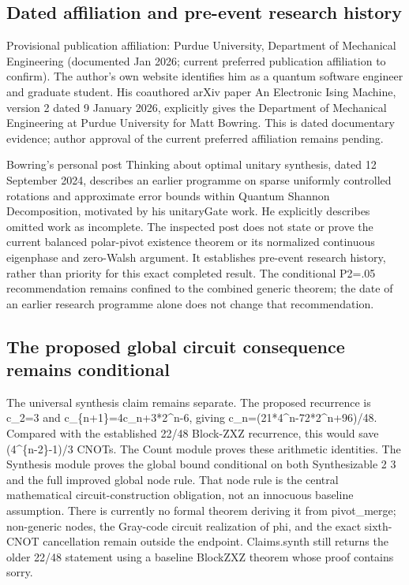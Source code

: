 \documentclass[11pt,a4paper]{article}
\begin{document}
\subsection{Dated affiliation and pre-event research history}
Provisional publication affiliation: Purdue University, Department of Mechanical Engineering (documented Jan 2026; current preferred publication affiliation to confirm). The author's own website identifies him as a quantum software engineer and graduate student. His coauthored arXiv paper An Electronic Ising Machine, version 2 dated 9 January 2026, explicitly gives the Department of Mechanical Engineering at Purdue University for Matt Bowring. This is dated documentary evidence; author approval of the current preferred affiliation remains pending.

Bowring's personal post Thinking about optimal unitary synthesis, dated 12 September 2024, describes an earlier programme on sparse uniformly controlled rotations and approximate error bounds within Quantum Shannon Decomposition, motivated by his unitaryGate work. He explicitly describes omitted work as incomplete. The inspected post does not state or prove the current balanced polar-pivot existence theorem or its normalized continuous eigenphase and zero-Walsh argument. It establishes pre-event research history, rather than priority for this exact completed result. The conditional P2=.05 recommendation remains confined to the combined generic theorem; the date of an earlier research programme alone does not change that recommendation.

\subsection{The proposed global circuit consequence remains conditional}
The universal synthesis claim remains separate. The proposed recurrence is c\_2=3 and c\_\{n+1\}=4c\_n+3*2\textasciicircum{}n-6, giving c\_n=(21*4\textasciicircum{}n-72*2\textasciicircum{}n+96)/48. Compared with the established 22/48 Block-ZXZ recurrence, this would save (4\textasciicircum{}\{n-2\}-1)/3 CNOTs. The Count module proves these arithmetic identities. The Synthesis module proves the global bound conditional on both Synthesizable 2 3 and the full improved global node rule. That node rule is the central mathematical circuit-construction obligation, not an innocuous baseline assumption. There is currently no formal theorem deriving it from pivot\_merge; non-generic nodes, the Gray-code circuit realization of phi, and the exact sixth-CNOT cancellation remain outside the endpoint. Claims.synth still returns the older 22/48 statement using a baseline BlockZXZ theorem whose proof contains sorry.
\end{document}
